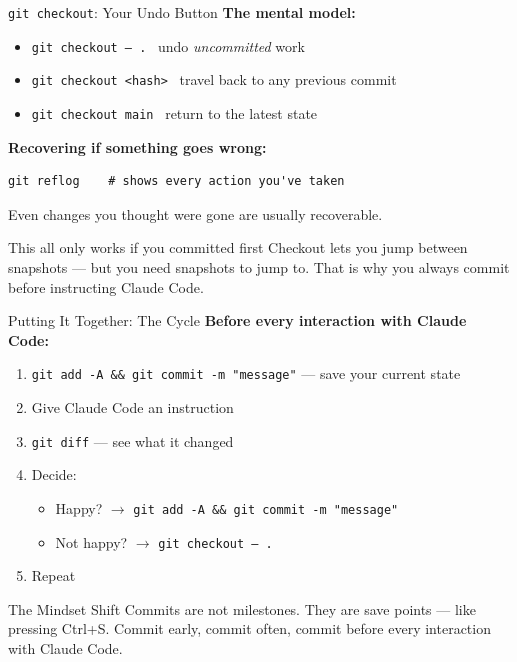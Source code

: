 \documentclass[aspectratio=169, 11pt]{beamer}
\begin{document}
\begin{frame}[fragile]{\texttt{git checkout}: Your Undo Button}
  \textbf{The mental model:}
  \begin{itemize}
    \item \texttt{git checkout -- .} \quad\textrightarrow\ undo \textit{uncommitted} work
    \item \texttt{git checkout <hash>} \quad\textrightarrow\ travel back to any previous commit
    \item \texttt{git checkout main} \quad\textrightarrow\ return to the latest state
  \end{itemize}

  \vspace{0.8em}
  \textbf{Recovering if something goes wrong:}
  \begin{lstlisting}
git reflog    # shows every action you've taken
  \end{lstlisting}
  Even changes you thought were gone are usually recoverable.

  \vspace{0.5em}
  \begin{alertblock}{This all only works if you committed first}
    Checkout lets you jump between snapshots --- but you need snapshots to jump to. That is why you always commit before instructing Claude Code.
  \end{alertblock}
\end{frame}

\begin{frame}{Putting It Together: The Cycle}
  \textbf{Before every interaction with Claude Code:}

  \vspace{0.3em}
  \begin{enumerate}
    \item \texttt{git add -A \&\& git commit -m "message"} --- save your current state
    \item Give Claude Code an instruction
    \item \texttt{git diff} --- see what it changed
    \item Decide:
    \begin{itemize}
      \item Happy? $\rightarrow$ \texttt{git add -A \&\& git commit -m "message"}
      \item Not happy? $\rightarrow$ \texttt{git checkout -- .}
    \end{itemize}
    \item Repeat
  \end{enumerate}

  \vspace{0.5em}
  \begin{block}{The Mindset Shift}
    Commits are not milestones. They are save points --- like pressing Ctrl+S. Commit early, commit often, commit before every interaction with Claude Code.
  \end{block}

  \vspace{0.5em}
  
\end{frame}
\end{document}
